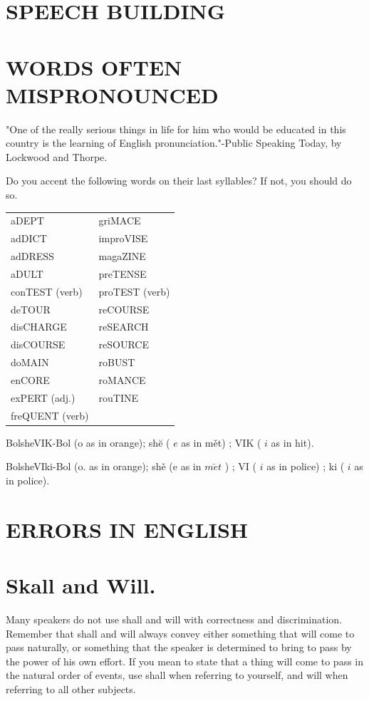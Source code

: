 \documentclass[10pt]{article}
\begin{document}
\section*{SPEECH BUILDING}
\section*{WORDS OFTEN MISPRONOUNCED}
"One of the really serious things in life for him who would be educated in this country is the learning of English pronunciation."-Public Speaking Today, by Lockwood and Thorpe.

Do you accent the following words on their last syllables? If not, you should do so.

\begin{center}
\begin{tabular}{ll}
aDEPT & griMACE \\
adDICT & improVISE \\
adDRESS & magaZINE \\
aDULT & preTENSE \\
conTEST (verb) & proTEST (verb) \\
deTOUR & reCOURSE \\
disCHARGE & reSEARCH \\
disCOURSE & reSOURCE \\
doMAIN & roBUST \\
enCORE & roMANCE \\
exPERT (adj.) & rouTINE \\
freQUENT (verb) &  \\
\end{tabular}
\end{center}

BolsheVIK-Bol (o as in orange); shĕ ( $e$ as in mět) ; VIK ( $i$ as in hit).

BolsheVIki-Bol (o. as in orange); shě (e as in $m \check{e} t$ ) ; VI ( $i$ as in police) ; ki ( $i$ as in police).

\section*{ERRORS IN ENGLISH}
\section*{Skall and Will.}
Many speakers do not use shall and will with correctness and discrimination. Remember that shall and will always convey either something that will come to pass naturally, or something that the speaker is determined to bring to pass by the power of his own effort. If you mean to state that a thing will come to pass in the natural order of events, use shall when referring to yourself, and will when referring to all other subjects.
\end{document}
